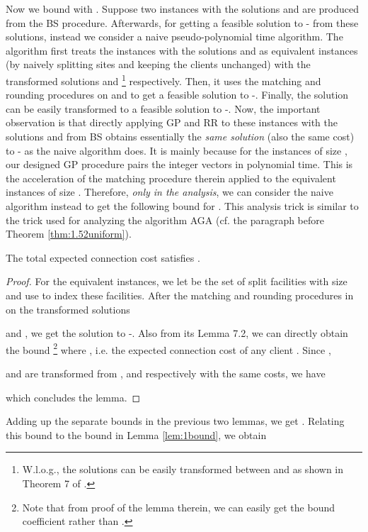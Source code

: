 \documentclass[10pt]{llncs}
\begin{document}
Now we bound  with . Suppose two  instances with the
solutions 
and  are produced
from the BS procedure. Afterwards, for getting a feasible solution
to - from these solutions, instead we consider a naive
pseudo-polynomial time algorithm. The algorithm first treats the 
instances with the solutions 
and  as equivalent
 instances (by naively splitting sites and keeping the clients
unchanged) with the transformed solutions 
and \footnote{W.l.o.g., the solutions can be easily transformed between 
and  as shown in Theorem 7 of \cite{kewen2011cocoon}. } respectively. Then, it uses the matching and rounding procedures
\cite{Swamy08FTFL2.076} on 
and 
to get a feasible solution 
to -. Finally, the solution 
can be easily transformed to a feasible solution 
to -. Now, the important observation is that directly applying
GP and RR to these  instances with the solutions 
and  from BS
obtains essentially the \textit{same solution} 
(also the same cost) to - as the naive algorithm does.
It is mainly because for the  instances of size ,
our designed GP procedure pairs the integer vectors in polynomial
time. This is the acceleration of the matching procedure therein \cite{Swamy08FTFL2.076}
applied to the equivalent  instances of size .
Therefore, \textit{only in the analysis}, we can consider the naive
algorithm instead to get the following bound for . This analysis
trick is similar to the trick used for analyzing the algorithm AGA
(cf. the paragraph before Theorem \ref{thm:1.52uniform}).
\begin{lemma}
The total expected connection cost  satisfies .\end{lemma}
\begin{proof}
For the equivalent  instances, we let  be
the set of split facilities with size 
and use  to index these facilities. After the matching and rounding
procedures in \cite{Swamy08FTFL2.076} on the transformed solutions

and ,
we get the solution 
to -. Also from its Lemma 7.2, we can directly obtain the
bound \footnote{Note that from proof of the lemma therein, we can easily get the bound
coefficient  rather than .} where , i.e.
the expected connection cost of any client . Since ,

and  are transformed
from , 
and 
respectively with the same costs, we have

which concludes the lemma.
\end{proof}
Adding up the separate bounds in the previous two lemmas, we get .
Relating this bound to the bound 
in Lemma \ref{lem:1bound}, we obtain
\end{document}
